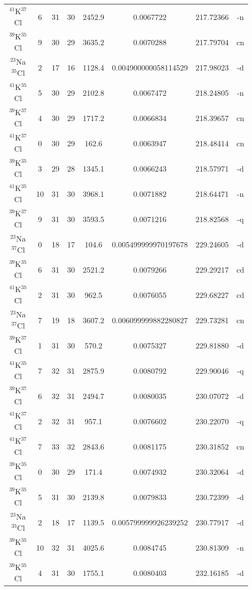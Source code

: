 \begin{table*}[htp]
\begin{tabular}{cccccccc}
$^{41}$K$^{37}$Cl & 6 & 31 & 30 & 2452.9 & 0.0067722 & 217.72366 & -n \\
$^{39}$K$^{35}$Cl & 9 & 30 & 29 & 3635.2 & 0.0070288 & 217.79704 & cn \\
$^{23}$Na$^{35}$Cl & 2 & 17 & 16 & 1128.4 & 0.004900000058114529 & 217.98023 & -d \\
$^{41}$K$^{35}$Cl & 5 & 30 & 29 & 2102.8 & 0.0067472 & 218.24805 & -n \\
$^{39}$K$^{37}$Cl & 4 & 30 & 29 & 1717.2 & 0.0066834 & 218.39657 & cn \\
$^{41}$K$^{37}$Cl & 0 & 30 & 29 & 162.6 & 0.0063947 & 218.48414 & cn \\
$^{39}$K$^{35}$Cl & 3 & 29 & 28 & 1345.1 & 0.0066243 & 218.57971 & -d \\
$^{41}$K$^{35}$Cl & 10 & 31 & 30 & 3968.1 & 0.0071882 & 218.64471 & -n \\
$^{39}$K$^{37}$Cl & 9 & 31 & 30 & 3593.5 & 0.0071216 & 218.82568 & -q \\
$^{23}$Na$^{37}$Cl & 0 & 18 & 17 & 104.6 & 0.005499999970197678 & 229.24605 & -d \\
$^{39}$K$^{35}$Cl & 6 & 31 & 30 & 2521.2 & 0.0079266 & 229.29217 & cd \\
$^{41}$K$^{35}$Cl & 2 & 31 & 30 & 962.5 & 0.0076055 & 229.68227 & cd \\
$^{23}$Na$^{37}$Cl & 7 & 19 & 18 & 3607.2 & 0.006099999882280827 & 229.73281 & cn \\
$^{39}$K$^{37}$Cl & 1 & 31 & 30 & 570.2 & 0.0075327 & 229.81880 & -d \\
$^{41}$K$^{35}$Cl & 7 & 32 & 31 & 2875.9 & 0.0080792 & 229.90046 & -q \\
$^{39}$K$^{37}$Cl & 6 & 32 & 31 & 2494.7 & 0.0080035 & 230.07072 & -d \\
$^{41}$K$^{37}$Cl & 2 & 32 & 31 & 957.1 & 0.0076602 & 230.22070 & -q \\
$^{41}$K$^{37}$Cl & 7 & 33 & 32 & 2843.6 & 0.0081175 & 230.31852 & cn \\
$^{39}$K$^{35}$Cl & 0 & 30 & 29 & 171.4 & 0.0074932 & 230.32064 & -d \\
$^{39}$K$^{35}$Cl & 5 & 31 & 30 & 2139.8 & 0.0079833 & 230.72399 & -d \\
$^{23}$Na$^{35}$Cl & 2 & 18 & 17 & 1139.5 & 0.005799999926239252 & 230.77917 & -d \\
$^{39}$K$^{35}$Cl & 10 & 32 & 31 & 4025.6 & 0.0084745 & 230.81309 & -n \\
$^{39}$K$^{35}$Cl & 4 & 31 & 30 & 1755.1 & 0.0080403 & 232.16185 & -d \\

\end{tabular}
\end{table*}
